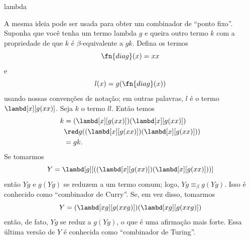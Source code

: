 \documentclass[../../../include/open-logic-section]{subfiles}
\begin{document}
\begin{tagblock}{lambda}
\begin{digress}
A mesma ideia pode ser usada para obter um combinador de ``ponto fixo''.
Suponha que você tenha um termo lambda $g$ e queira outro termo $k$ com
a propriedade de que $k$ é $\beta$-equivalente a $gk$. Defina os termos
\[
\fn{diag}(x) = xx
\]
e
\[
l(x) = g(\fn{diag}(x))
\]
usando nossas convenções de notação; em outras palavras, $l$ é o termo
$\lambd[x][g(xx)]$. Seja $k$ o termo $ll$. Então temos
\begin{align*}
k & = (\lambd[x][g(xx)])(\lambd[x][g(xx)]) \\
& \red  g((\lambd[x][g(xx)])(\lambd[x][g(xx)])) \\
& = gk.
\end{align*}
Se tomarmos
\[
Y = \lambd[g][((\lambd[x][g(xx)])(\lambd[x][g(xx)]))]
\]
então $Yg$ e $g(Yg)$ se reduzem a um termo comum; logo,
$Yg \equiv_\beta g(Yg)$. Isso é conhecido como ``combinador de
Curry''. Se, em vez disso, tomarmos
\[
Y = (\lambd[xg][g(xxg)])(\lambd[xg][g(xxg)])
\]
então, de fato, $Yg$ se reduz a $g(Yg)$, o que é uma afirmação mais
forte. Essa última versão de $Y$ é conhecida como ``combinador de
Turing''.
\end{digress}
\end{tagblock}
\end{document}

